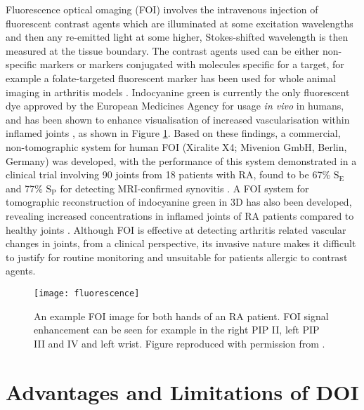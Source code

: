 \documentclass[twoside]{bhamthesis}
\theoremstyle{definition}
\begin{document}
Fluorescence optical omaging (FOI) involves the intravenous injection of fluorescent contrast agents which are illuminated at some excitation wavelengths and then any re-emitted light at some higher, Stokes-shifted wavelength is then measured at the tissue boundary. The contrast agents used can be either non-specific markers or markers conjugated with molecules specific for a target, for example a folate-targeted fluorescent marker has been used for whole animal imaging in arthritis models \cite{chen2005arthritis}. Indocyanine green is currently the only fluorescent dye approved by the European Medicines Agency for usage \textit{in vivo} in humans, and has been shown to enhance visualisation of increased vascularisation within inflamed joints \cite{werner2012inflammation}, as shown in Figure \ref{fig:fluorescence}. Based on these findings, a commercial, non-tomographic system for human FOI (Xiralite X4; Mivenion GmbH, Berlin, Germany) was developed, with the performance of this system demonstrated in a clinical trial involving 90 joints from 18 patients with RA, found to be 67\% $\mathrm{S_E}$ and 77\% $\mathrm{S_P}$ for detecting MRI-confirmed synovitis \cite{schafer2013quantitative}. A FOI system for tomographic reconstruction of indocyanine green in 3D has also been developed, revealing increased concentrations in inflamed joints of RA patients compared to healthy joints \cite{mohajerani2014fluorescence}. Although FOI is effective at detecting arthritis related vascular changes in joints, from a clinical perspective, its invasive nature makes it difficult to justify for routine monitoring and unsuitable for patients allergic to contrast agents.

\begin{figure}[!ht]
\centering\texttt{[image: fluorescence]}\caption{An example FOI image  for both hands of an RA patient. FOI signal enhancement can be seen for example in the right PIP II, left PIP III and IV and left wrist. Figure reproduced with permission from \cite{werner2012inflammation}.}
  \label{fig:fluorescence}
\end{figure}

\section{Advantages and Limitations of DOI}
\end{document}
